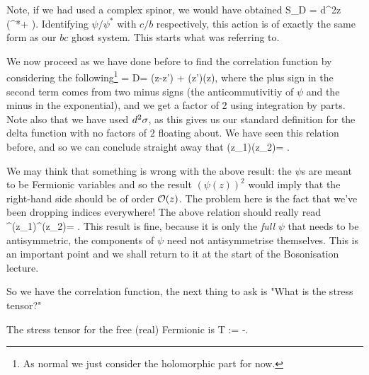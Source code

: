 \br 
\label{rem:DiracDone}
    Note, if we had used a complex spinor, we would have obtained 
    \bse 
        S_D =  \int d^2z \big(\psi^*\overline{\p}\psi + \overline{\psi^*}\p\overline{\psi}\big).
    \ese 
    Identifying $\psi/\psi^*$ with $c/b$ respectively, this action is of exactly the same form as our $bc$ ghost system. This starts what  was referring to.
\er 

We now proceed as we have done before to find the correlation function by considering the following\footnote{As normal we just consider the holomorphic part for now.}
 = \int D\psi {} = \del(z-z') +  \big\la \psi(z')\overline{\p}\psi(z)\big\ra,
\ese
where the plus sign in the second term comes from two minus signs (the anticommutivitiy of $\psi$ and the minus in the exponential), and we get a factor of 2 using integration by parts. Note also that we have used $d^2\sigma$, as this gives us our standard definition for the delta function with no factors of $2$ floating about. We have seen this relation before, and so we can conclude straight away that 
\be 
\label{eqn:PsiCorrelation}
    \big\la \psi(z_1)\psi(z_2)\big\ra = .
\ee 

\br 
\label{rem:PsiComponentsOPE}
    We may think that something is wrong with the above result: the $\psi$s are meant to be Fermionic variables and so the result $(\psi(z))^2$ would imply that the right-hand side should be of order $\mathcal{O}(z)$. The problem here is the fact that we've been dropping indices everywhere! The above relation should really read 
    \be 
    \label{eqn:PsiComponetsOPE}
        \big\la \psi^{\mu}(z_1)\psi^{\nu}(z_2)\big\ra = .
    \ee 
    This result is fine, because it is only the \textit{full} $\psi$ that needs to be antisymmetric, the components of $\psi$ need not antisymmetrise themselves. This is an important point and we shall return to it at the start of the Bosonisation lecture.
\er 

So we have the correlation function, the next thing to ask is "What is the stress tensor?"

\bcl 
    The stress tensor for the free (real) Fermionic is 
    \be 
    \label{eqn:FreeFermionicStressTensor}
        T := -\cl \psi\p\psi\cl .
    \ee 
\ecl 

